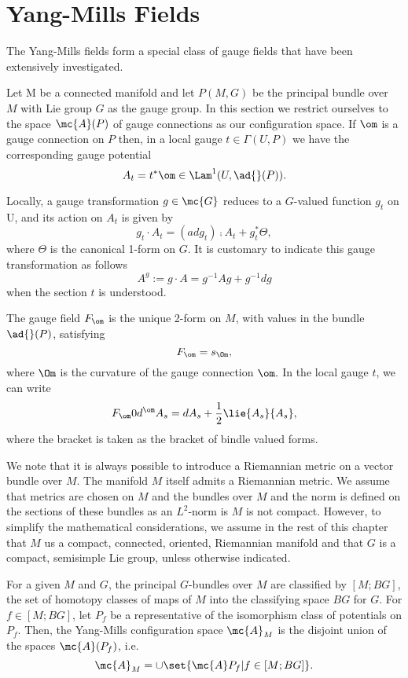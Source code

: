 \section{Yang-Mills Fields}

The Yang-Mills fields form a special class of gauge fields that have been extensively investigated.

Let M be a connected manifold and let $P(M, G)$ be the principal bundle over $M$ with Lie group $G$ as the gauge group.
In this section we restrict ourselves to the space $\mc{A}(P)$ of gauge connections as our configuration space. If
$\om$ is a gauge connection on $P$ then, in a local gauge $t \in \Gamma(U, P)$ we have the corresponding gauge
potential
$$
A_{t}=t^{*}\om \in \Lam^{1}(U, \ad{}(P)).
$$

Locally, a gauge transformation $g \in \mc{G}$ reduces to a $G$-valued function $g_{t}$ on U, and its action on $A_{t}$
is given by
$$
g_{t}\cdot A_{t}=(ad g_{t}) \comp A_{t}+ g_{t}^{*}\Theta,
$$
where $\Theta$ is the canonical 1-form on $G$. It is customary to indicate this gauge transformation as follows
$$
A^{g}:=g \cdot A = g^{-1}Ag + g^{-1}dg
$$
when the section $t$ is understood.

The gauge field $F_{\om}$ is the unique 2-form on $M$, with values in the bundle $\ad{}(P)$, satisfying
$$
F_{\om}=s_{\Om},
$$
where $\Om$ is the curvature of the gauge connection $\om.$ In the local gauge $t$, we can write
$$
F_{\om}0 d^{\om}A_{s}= dA_{s}+\frac{1}{2}\lie{A_{s}}{A_{s}},
$$
where the bracket is taken as the bracket of bindle valued forms.

We note that it is always possible to introduce a Riemannian metric on a vector bundle over $M$. The manifold $M$ itself
admits a Riemannian metric. We assume that metrics are chosen on $M$ and the bundles over $M$ and the norm is defined
on the sections of these bundles as an $L^{2}$-norm is $M$ is not compact. However, to simplify the mathematical
considerations, we assume in the rest of this chapter that $M$ us a compact, connected, oriented, Riemannian manifold
and that $G$ is a compact, semisimple Lie group, unless otherwise indicated.

For a given $M$ and $G$, the principal $G$-bundles over $M$ are classified by $[M; BG]$, the set of homotopy classes of
maps of $M$ into the classifying space $BG$ for $G$. For $f \in [M; BG]$, let $P_{f}$ be a representative of the
isomorphism class of potentials on $P_{f}.$ Then, the Yang-Mills configuration space $\mc{A}_{M}$ is the disjoint union
of the spaces $\mc{A}(P_{f})$, i.e.
$$
\mc{A}_{M}= \cup\set{\mc{A}P_{f}| f \in [M; BG]}.
$$

